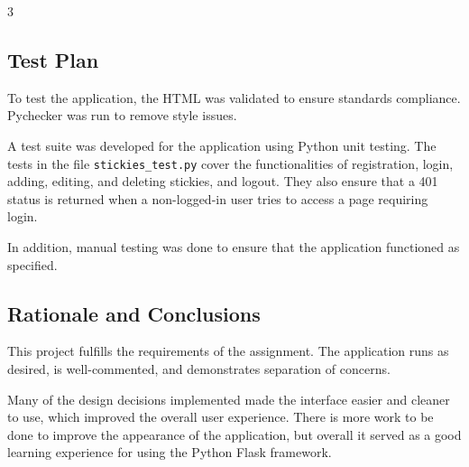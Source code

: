 3\documentclass[11pt,letterpaper]{article}
\begin{document}
\subsection{Test Plan}
To test the application, the HTML was validated to ensure standards compliance. Pychecker was run to remove style issues.

A test suite was developed for the application using Python unit testing. The tests in the file \texttt{stickies\_test.py} cover the functionalities of registration, login, adding, editing, and deleting stickies, and logout. They also ensure that a 401 status is returned when a non-logged-in user tries to access a page requiring login.

In addition, manual testing was done to ensure that the application functioned as specified.

\subsection{Rationale and Conclusions}
This project fulfills the requirements of the assignment. The application runs as desired, is well-commented, and demonstrates separation of concerns.

Many of the design decisions implemented made the interface easier and cleaner to use, which improved the overall user experience. There is more work to be done to improve the appearance of the application, but overall it served as a good learning experience for using the Python Flask framework.
\end{document}
